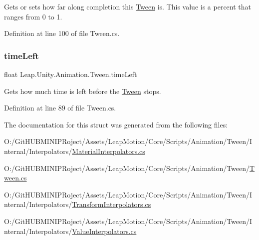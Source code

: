 Gets or sets how far along completion this \mbox{\hyperlink{struct_leap_1_1_unity_1_1_animation_1_1_tween}{Tween}} is. This value is a percent that ranges from 0 to 1. 



Definition at line 100 of file Tween.\+cs.

\mbox{\label{struct_leap_1_1_unity_1_1_animation_1_1_tween_a27ebf28615fd4bfe76cf8c9eb2bd3379}} 
\subsubsection{\texorpdfstring{timeLeft}{timeLeft}}
{\footnotesize\ttfamily float Leap.\+Unity.\+Animation.\+Tween.\+time\+Left\hspace{0.3cm}{\ttfamily [get]}}



Gets how much time is left before the \mbox{\hyperlink{struct_leap_1_1_unity_1_1_animation_1_1_tween}{Tween}} stops. 



Definition at line 89 of file Tween.\+cs.



The documentation for this struct was generated from the following files\+:\begin{DoxyCompactItemize}
\item 
O\+:/\+Git\+H\+U\+B\+M\+I\+N\+I\+P\+Roject/\+Assets/\+Leap\+Motion/\+Core/\+Scripts/\+Animation/\+Tween/\+Internal/\+Interpolators/\mbox{\hyperlink{_material_interpolators_8cs}{Material\+Interpolators.\+cs}}\item 
O\+:/\+Git\+H\+U\+B\+M\+I\+N\+I\+P\+Roject/\+Assets/\+Leap\+Motion/\+Core/\+Scripts/\+Animation/\+Tween/\mbox{\hyperlink{_tween_8cs}{Tween.\+cs}}\item 
O\+:/\+Git\+H\+U\+B\+M\+I\+N\+I\+P\+Roject/\+Assets/\+Leap\+Motion/\+Core/\+Scripts/\+Animation/\+Tween/\+Internal/\+Interpolators/\mbox{\hyperlink{_transform_interpolators_8cs}{Transform\+Interpolators.\+cs}}\item 
O\+:/\+Git\+H\+U\+B\+M\+I\+N\+I\+P\+Roject/\+Assets/\+Leap\+Motion/\+Core/\+Scripts/\+Animation/\+Tween/\+Internal/\+Interpolators/\mbox{\hyperlink{_value_interpolators_8cs}{Value\+Interpolators.\+cs}}\end{DoxyCompactItemize}

